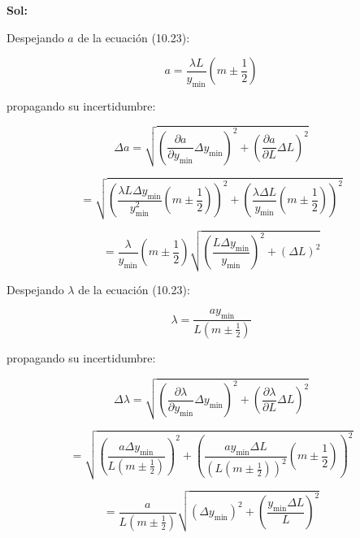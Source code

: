 \documentclass[12pt,a4paper]{article}
\begin{document}
\begin{enumerate}
\textbf{Sol:}

Despejando $a$ de la ecuación (10.23):

\begin{equation*}
    a = \frac{\lambda L}{y_{\text{min}}}\left(m \pm \frac{1}{2}\right)
\end{equation*}

propagando su incertidumbre:

\begin{equation*}
    \Delta a = \sqrt{\left(\frac{\partial a}{\partial y_{\text{min}}}\Delta y_{\text{min}}\right)^{2} + \left(\frac{\partial a}{\partial L} \Delta L\right)^{2}}
\end{equation*}

\begin{equation*}
    =\sqrt{\left(\frac{\lambda L \Delta y_{\text{min}}}{y_{\text{min}}^{2}}\left(m \pm \frac{1}{2}\right)\right)^{2}+\left(\frac{\lambda \Delta L}{y_{\text{min}}}\left(m \pm \frac{1}{2}\right)\right)^{2}}
\end{equation*}

\begin{equation*}
    = \frac{\lambda} {y_{\text{min}}} \left(m \pm \frac{1}{2}\right) \sqrt{\left(\frac{L\Delta y_{\text{min}}}{y_{\text{min}}}\right)^{2}+ \left(\Delta L\right)^{2}}
\end{equation*}

Despejando $\lambda$ de la ecuación (10.23):

\begin{equation*}
    \lambda = \frac{a y_{\text{min}}}{L \left(m \pm \frac{1}{2}\right)}
\end{equation*}

propagando su incertidumbre:

\begin{equation*}
    \Delta \lambda = \sqrt{\left(\frac{\partial \lambda}{\partial y_{\text{min}}}\Delta y_{\text{min}}\right)^{2} + \left(\frac{\partial \lambda}{\partial L}\Delta L\right)^{2}}
\end{equation*}

\begin{equation*}
    = \sqrt{\left(\frac{a \Delta y_{\text{min}}}{L \left(m \pm \frac{1}{2}\right)}\right)^{2} + \left(\frac{a y_{\text{min}}\Delta L}{(L(m\pm\frac{1}{2}))^{2}} \left(m \pm \frac{1}{2}\right)\right)^{2}}
\end{equation*}

\begin{equation*}
    = \frac{a}{L (m \pm \frac{1}{2})} \sqrt{\left(\Delta y_{\text{min}}\right)^{2} + \left(\frac{y_{\text{min}}\Delta L}{ L}\right)^{2}}
\end{equation*}





\end{enumerate}
\end{document}
